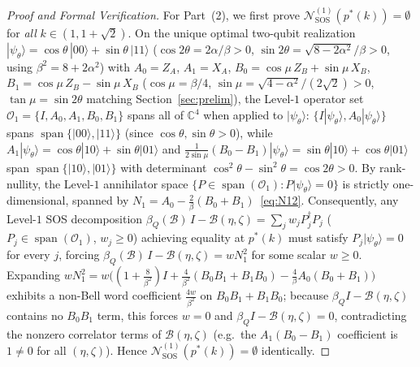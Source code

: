 \documentclass[11pt,a4paper]{article}
\newcommand{\calB}{\mathcal{B}}
\begin{document}
\begin{proof}[Proof and Formal Verification]
For Part~(2), we first prove $\mathcal{N}_{\mathrm{SOS}}^{(1)}(p^*(k)) = \emptyset$ for \emph{all} $k \in (1, 1+\sqrt{2})$. On the unique optimal two-qubit realization $|\psi_\theta\rangle = \cos\theta\,|00\rangle + \sin\theta\,|11\rangle$ ($\cos 2\theta = 2\alpha/\beta > 0$, $\sin 2\theta = \sqrt{8-2\alpha^2}/\beta > 0$, using $\beta^2 = 8 + 2\alpha^2$) with $A_0 = Z_A$, $A_1 = X_A$, $B_0 = \cos\mu\, Z_B + \sin\mu\, X_B$, $B_1 = \cos\mu\, Z_B - \sin\mu\, X_B$ ($\cos\mu = \beta/4$, $\sin\mu = \sqrt{4-\alpha^2}/(2\sqrt{2}) > 0$, $\tan\mu = \sin 2\theta$ matching Section~\ref{sec:prelim}), the Level-$1$ operator set $\mathcal{O}_1 = \{I, A_0, A_1, B_0, B_1\}$ spans all of $\mathbb{C}^4$ when applied to $|\psi_\theta\rangle$: $\{I|\psi_\theta\rangle, A_0|\psi_\theta\rangle\}$ spans $\operatorname{span}\{|00\rangle, |11\rangle\}$ (since $\cos\theta, \sin\theta > 0$), while $A_1|\psi_\theta\rangle = \cos\theta|10\rangle + \sin\theta|01\rangle$ and $\frac{1}{2\sin\mu}(B_0 - B_1)|\psi_\theta\rangle = \sin\theta|10\rangle + \cos\theta|01\rangle$ span $\operatorname{span}\{|10\rangle, |01\rangle\}$ with determinant $\cos^2\theta - \sin^2\theta = \cos 2\theta > 0$. By rank-nullity, the Level-$1$ annihilator space $\{P \in \operatorname{span}(\mathcal{O}_1) : P|\psi_\theta\rangle = 0\}$ is strictly one-dimensional, spanned by $N_1 = A_0 - \frac{2}{\beta}(B_0 + B_1)$~\eqref{eq:N12}. Consequently, any Level-$1$ SOS decomposition $\beta_Q(\calB)\,I - \calB(\eta,\zeta) = \sum_j w_j P_j^\dagger P_j$ ($P_j \in \operatorname{span}(\mathcal{O}_1)$, $w_j \ge 0$) achieving equality at $p^*(k)$ must satisfy $P_j |\psi_\theta\rangle = 0$ for every $j$, forcing $\beta_Q(\calB)\,I - \calB(\eta,\zeta) = w N_1^2$ for some scalar $w \ge 0$. Expanding $w N_1^2 = w\bigl((1 + \frac{8}{\beta^2})I + \frac{4}{\beta^2}(B_0 B_1 + B_1 B_0) - \frac{4}{\beta} A_0(B_0 + B_1)\bigr)$ exhibits a non-Bell word coefficient $\frac{4w}{\beta^2}$ on $B_0 B_1 + B_1 B_0$; because $\beta_Q I - \calB(\eta,\zeta)$ contains no $B_0 B_1$ term, this forces $w = 0$ and $\beta_Q I - \calB(\eta,\zeta) = 0$, contradicting the nonzero correlator terms of $\calB(\eta,\zeta)$ (e.g.\ the $A_1(B_0-B_1)$ coefficient is $1 \neq 0$ for all $(\eta,\zeta)$). Hence $\mathcal{N}_{\mathrm{SOS}}^{(1)}(p^*(k)) = \emptyset$ identically.


\end{proof}
\end{document}
